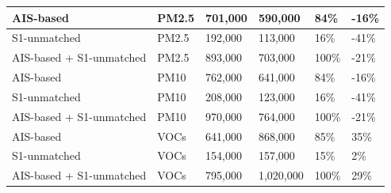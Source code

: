 \begin{table}[!h]
\begin{tabular}[t]{l|l|l|l|l|l}
\hline
AIS-based & PM2.5 & 701,000 & 590,000 & 84\% & -16\%\\
\hline
S1-unmatched & PM2.5 & 192,000 & 113,000 & 16\% & -41\%\\
\hline
AIS-based + S1-unmatched & PM2.5 & 893,000 & 703,000 & 100\% & -21\%\\
\hline
AIS-based & PM10 & 762,000 & 641,000 & 84\% & -16\%\\
\hline
S1-unmatched & PM10 & 208,000 & 123,000 & 16\% & -41\%\\
\hline
AIS-based + S1-unmatched & PM10 & 970,000 & 764,000 & 100\% & -21\%\\
\hline
AIS-based & VOCs & 641,000 & 868,000 & 85\% & 35\%\\
\hline
S1-unmatched & VOCs & 154,000 & 157,000 & 15\% & 2\%\\
\hline
AIS-based + S1-unmatched & VOCs & 795,000 & 1,020,000 & 100\% & 29\%\\
\hline
\end{tabular}
\end{table}
